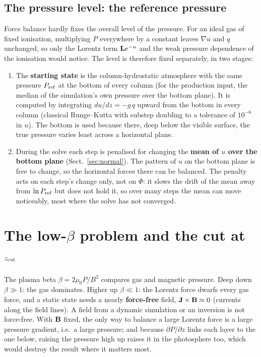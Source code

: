 \subsection{The pressure level: the reference pressure}\label{sec:level}
Force balance hardly fixes the overall level of the pressure. For an ideal gas of fixed ionisation, multiplying $P$
everywhere by a constant leaves $\nabla u$ and $q$ unchanged, so only the Lorentz term $\mathbf L e^{-u}$ and the weak pressure
dependence of the ionisation would notice. The level is therefore fixed separately, in two stages:
\begin{enumerate}
\item The \textbf{starting state} is the column-hydrostatic atmosphere with the same pressure $P_{\rm ref}$ at the bottom of
every column (for the production input, the median of the simulation's own pressure over the bottom plane). It is computed
by integrating $du/dz=-g\,q$ upward from the bottom in every column (classical Runge--Kutta with substep doubling to a
tolerance of $10^{-6}$ in $u$). The bottom is used because there, deep below the visible surface, the true pressure varies
least across a horizontal plane.
\item During the solve each step is penalised for changing the \textbf{mean of $u$ over the bottom plane}
(Sect.~\ref{sec:normal}). The pattern of $u$ on the bottom plane is free to change, so the horizontal forces there can be
balanced. The penalty acts on each step's change only, not on $\Phi$: it slows the drift of the mean away from $\ln P_{\rm
ref}$ but does not hold it, so over many steps the mean can move noticeably, most where the solve has not converged.
\end{enumerate}

\section{\texorpdfstring{The low-$\beta$ problem and the cut at $z_{\rm cut}$}{The low-beta problem and the cut at z\_cut}}\label{sec:cut}
The plasma beta $\beta=2\mu_0P/B^2$ compares gas and magnetic pressure. Deep down $\beta\gg1$: the gas dominates. Higher up
$\beta\ll1$: the Lorentz force dwarfs every gas force, and a static state needs a nearly \textbf{force-free} field,
$\mathbf J\times\mathbf B\approx0$ (currents along the field lines). A field from a dynamic simulation or an inversion is not force-free.
With $\mathbf B$ fixed, the only way to balance a large Lorentz force is a large pressure gradient, i.e.\ a large pressure; and
because $\partial P/\partial z$ links each layer to the one below, raising the pressure high up raises it in the photosphere
too, which would destroy the result where it matters most.

